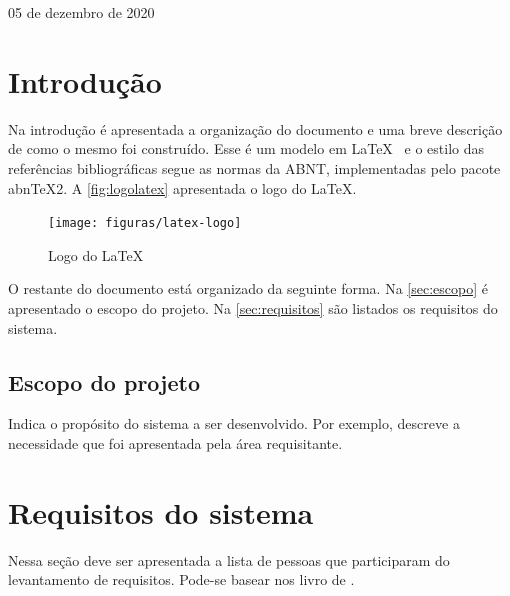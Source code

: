 \documentclass[11pt]{../../classes/ifscarticle}
\begin{document}
\begin{flushright}
05 de dezembro de 2020
\end{flushright}

\clearpage
\pagestyle{firstpage}

\tableofcontents
\clearpage


\section{Introdução}
\label{sec:introducao}

Na introdução é apresentada a organização do documento e uma breve descrição de como o mesmo foi construído.   Esse é um modelo em \LaTeX~ \cite{lamport94} e o estilo das referências bibliográficas segue as normas da ABNT, implementadas pelo pacote abnTeX2. A \autoref{fig:logolatex} apresentada o logo do \LaTeX.

\begin{figure}[ht]
    \centering
    \texttt{[image: figuras/latex-logo]}
    \caption{Logo do \LaTeX}
    \label{fig:logolatex}
\end{figure}

\lipsum[1]

O restante do documento está organizado da seguinte forma. Na \autoref{sec:escopo} é apresentado o escopo do projeto. Na \autoref{sec:requisitos} são listados os requisitos do sistema.

\subsection{Escopo do projeto}
\label{sec:escopo}

Indica o propósito do sistema a ser desenvolvido. Por exemplo, descreve a necessidade que foi apresentada pela área requisitante. \lipsum[2]


\section{Requisitos do sistema}
\label{sec:requisitos}

Nessa seção deve ser apresentada a lista de pessoas que participaram do levantamento de requisitos. Pode-se basear nos livro de \cite{bezerra02}.
\end{document}
